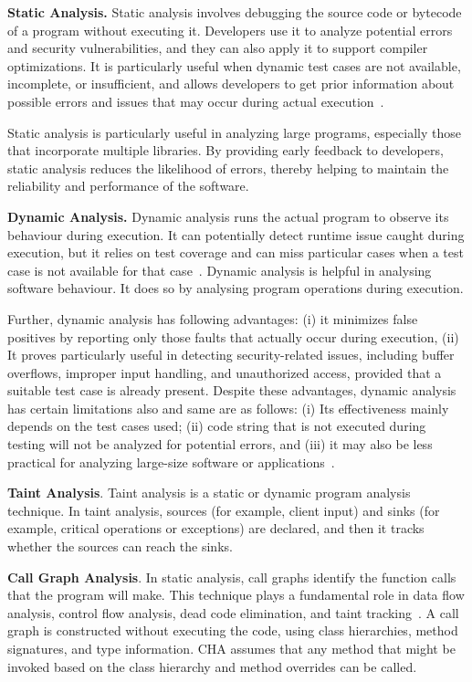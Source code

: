 \textbf{Static Analysis.} Static analysis involves debugging the source code or bytecode
of a program without executing it. Developers use it to analyze potential errors and
security vulnerabilities, and they can also apply it to support compiler optimizations.
It is particularly useful when dynamic test cases are not available,
incomplete, or insufficient, and allows developers to get prior information about possible
errors and issues that may occur during actual execution~\cite{Rahaman2023}.

Static analysis is particularly useful in analyzing large programs, especially those that
incorporate multiple libraries. By providing early feedback to developers,
static analysis reduces the likelihood of errors, thereby helping to maintain the reliability
and performance of the software.

\textbf{Dynamic Analysis.} Dynamic analysis runs the actual program to observe its
behaviour during execution. It can potentially detect runtime issue caught
during execution, but it relies on test coverage and can miss particular cases when a test
case is not available for that case~\cite{Kuliamin2024}. Dynamic analysis is helpful in analysing software
behaviour. It does so by analysing program operations during execution.

Further, dynamic analysis has following advantages: (i) it minimizes false positives by reporting only those faults that actually
occur during execution, (ii) It proves particularly useful in detecting security-related issues,
including buffer overflows, improper input handling, and unauthorized access, provided that a
suitable test case is already present. Despite these advantages, dynamic analysis has certain limitations
also and same are as follows: (i) Its effectiveness mainly depends on the test cases used;
(ii) code string that is not executed during testing will not be analyzed for potential
errors, and (iii) it may also be less practical for analyzing large-size software or
applications~\cite{Somi2024}.

\textbf{Taint Analysis}. Taint analysis is a static or dynamic program analysis technique.
In taint analysis, sources (for example, client input) and sinks (for example, critical
operations or exceptions) are declared, and then it tracks whether the sources can reach the sinks.


\textbf{Call Graph Analysis}. In static analysis, call graphs identify the function calls that the
program will make. This technique plays a fundamental role in data flow analysis, control flow analysis,
dead code elimination, and taint tracking~\cite{Keshani2024}. A call graph is constructed without
executing the code, using class hierarchies, method signatures, and type information. CHA assumes
that any method that might be invoked based on the class hierarchy and method overrides can be called.

